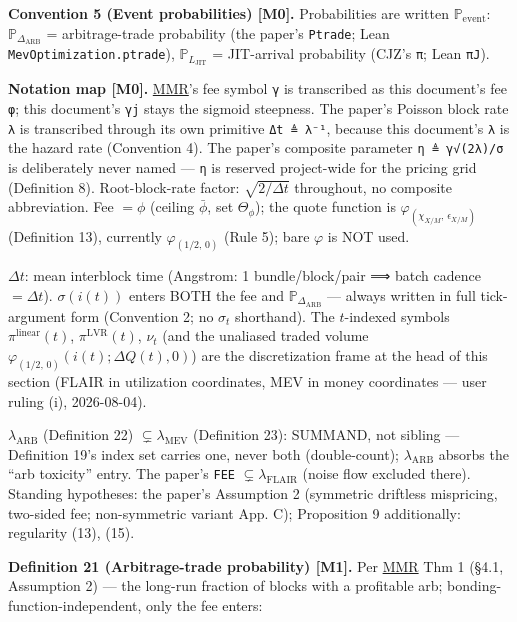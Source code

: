\documentclass[11pt]{article}
\renewcommand{\_}{\textunderscore\allowbreak}
\begin{document}
\textbf{Convention 5 (Event probabilities) {[}M0{]}.} Probabilities are written \(\mathbb{P}_{\text{event}}\): \(\mathbb{P}_{\Delta_{\text{ARB}}}\) = arbitrage-trade probability (the paper's \texttt{P\_trade}; Lean \texttt{MevOptimization.ptrade}), \(\mathbb{P}_{L_{\text{JIT}}}\) = JIT-arrival probability (CJZ's \texttt{π}; Lean \texttt{πJ}).

\textbf{Notation map {[}M0{]}.} \href{../refs/mev/MilionisMoallemiRoughgardenArbProfitsFees.pdf}{MMR}'s fee symbol \texttt{γ} is transcribed as this document's fee \texttt{φ}; this document's \texttt{γ\_j} stays the sigmoid steepness. The paper's Poisson block rate \texttt{λ} is transcribed through its own primitive \texttt{Δt\ ≜\ λ⁻¹}, because this document's \texttt{λ} is the hazard rate (Convention 4). The paper's composite parameter \texttt{η\ ≜\ γ√(2λ)/σ} is deliberately never named --- \texttt{η} is reserved project-wide for the pricing grid (Definition 8). Root-block-rate factor: \(\sqrt{2/\Delta t}\) throughout, no composite abbreviation. Fee \(= \phi\) (ceiling \(\bar\phi\), set \(\Theta_{\phi}\)); the quote function is \(\varphi_{(\chi_{X/M},\,\epsilon_{X/M})}\) (Definition 13), currently \(\varphi_{(1/2,\,0)}\) (Rule 5); bare \(\varphi\) is NOT used.

\(\Delta t\): mean interblock time (Angstrom: 1 bundle/block/pair ⟹ batch cadence \(= \Delta t\)). \(\sigma(i(t))\) enters BOTH the fee and \(\mathbb{P}_{\Delta_{\text{ARB}}}\) --- always written in full tick-argument form (Convention 2; no \(\sigma_t\) shorthand). The \(t\)-indexed symbols \(\pi^{\text{linear}}(t)\), \(\pi^{\mathrm{LVR}}(t)\), \(\nu_t\) (and the unaliased traded volume \(\varphi_{(1/2,\,0)}(i(t); \Delta Q(t), 0)\)) are the discretization frame at the head of this section (FLAIR in utilization coordinates, MEV in money coordinates --- user ruling (i), 2026-08-04).

\(\lambda_{\text{ARB}}\) (Definition 22) \(\subsetneq \lambda_{\text{MEV}}\) (Definition 23): SUMMAND, not sibling --- Definition 19's index set carries one, never both (double-count); \(\lambda_{\text{ARB}}\) absorbs the ``arb toxicity'' entry. The paper's \texttt{FEE} \(\subsetneq \lambda_{\text{FLAIR}}\) (noise flow excluded there). Standing hypotheses: the paper's Assumption 2 (symmetric driftless mispricing, two-sided fee; non-symmetric variant App. C); Proposition 9 additionally: regularity (13), (15).

\textbf{Definition 21 (Arbitrage-trade probability) {[}M1{]}.} Per \href{../refs/mev/MilionisMoallemiRoughgardenArbProfitsFees.pdf}{MMR} Thm 1 (§4.1, Assumption 2) --- the long-run fraction of blocks with a profitable arb; bonding-function-independent, only the fee enters:
\end{document}
